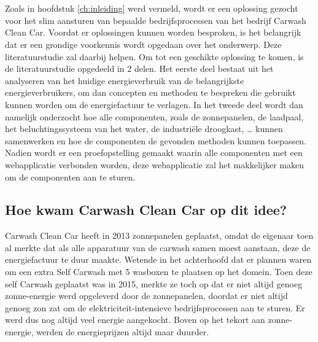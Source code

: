 \chapter{}%
\label{ch:stand-van-zaken}



Zoals in hoofdstuk \ref{ch:inleiding} werd vermeld, wordt er een oplossing gezocht voor het slim aansturen van bepaalde bedrijfsprocessen van het bedrijf Carwash Clean Car. Voordat er oplossingen kunnen worden besproken, is het belangrijk dat er een grondige voorkennis wordt opgedaan over het onderwerp. Deze literatuurstudie zal daarbij helpen. Om tot een geschikte oplossing te komen, is de literatuurstudie opgedeeld in 2 delen. Het eerste deel bestaat uit het analyseren van het huidige energieverbruik van de belangrijkste energieverbruikers, om dan concepten en methoden te bespreken die gebruikt kunnen worden om de energiefactuur te verlagen. In het tweede deel wordt dan namelijk onderzocht hoe alle componenten, zoals de zonnepanelen, de laadpaal, het beluchtingssysteem van het water, de industriële droogkast, … kunnen samenwerken en hoe de componenten de gevonden methoden kunnen toepassen. Nadien wordt er een proefopstelling gemaakt waarin alle componenten met een webapplicatie verbonden worden, deze webapplicatie zal het makkelijker maken om de componenten aan te sturen.

\section{Hoe kwam Carwash Clean Car op dit idee?}
\label{sec:stand-van-zaken-idee}

Carwash Clean Car heeft in 2013 zonnepanelen geplaatst, omdat de eigenaar toen al merkte dat als alle apparatuur van de carwash samen moest aanstaan, deze de energiefactuur te duur maakte. Wetende in het achterhoofd dat er plannen waren om een extra Self Carwash met 5 wasboxen te plaatsen op het domein. Toen deze self Carwash geplaatst was in 2015, merkte ze toch op dat er niet altijd genoeg zonne-energie werd opgeleverd door de zonnepanelen, doordat er niet altijd genoeg zon zat om de elektriciteit-intensieve bedrijfsprocessen aan te sturen. Er werd dus nog altijd veel energie aangekocht. Boven op het tekort aan zonne-energie, werden de energieprijzen altijd maar duurder.

